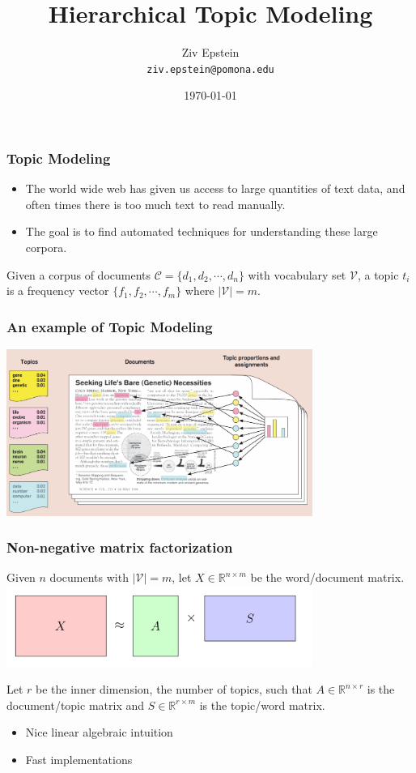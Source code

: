 \documentclass{beamer}
\title{Hierarchical Topic Modeling}
\author{Ziv Epstein \\ \texttt{ziv.epstein@pomona.edu}}
\institute{Pomona College}
\date{\today}
\begin{document}
	
	\frame{\titlepage}
	
	\begin{frame}
		\frametitle{Topic Modeling}
		\begin{itemize}
			\item 	The world wide web has given us access to large quantities of text data, and often times there is too much text to read manually.
			\item The goal is to find automated techniques for understanding these large corpora.
		\end{itemize}
	
		\begin{definition}
			Given a corpus of documents $\mathcal{C} = \{d_1,d_2,\cdots,d_n\}$ with vocabulary set $\mathcal{V}$, a \alert{topic} $t_i$ is a frequency vector $\{f_1,f_2,\cdots, f_m\}$ where $|\mathcal{V}| = m$.
		\end{definition}
	\end{frame}
	\begin{frame}
		\frametitle{An example of Topic Modeling}
		\includegraphics[width=10cm]{tmex}
	\end{frame}
		\begin{frame}
			\frametitle{Non-negative matrix factorization}
			Given $n$ documents with $|\mathcal{V}| = m$, let $X \in \mathbb{R}^{n \times m}$ be the word/document matrix.
				\includegraphics[width=10cm]{nnmf}
				
				Let $r$ be the inner dimension, the number of topics, such that $ A\in \mathbb{R}^{n \times r}$ is the document/topic matrix and $S\in \mathbb{R}^{r \times m}$ is the topic/word matrix.
				\begin{itemize}
					\item Nice linear algebraic intuition
					\item Fast implementations
				\end{itemize}
		\end{frame}
\end{document}
